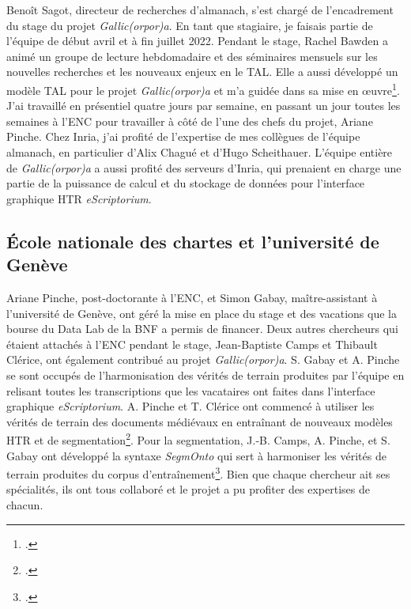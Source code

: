 \documentclass[class=article, crop=false]{standalone}
\begin{document}
Benoît Sagot, directeur de recherches d'\acrshort{almanach}, s'est chargé de l'encadrement du stage du projet \textit{Gallic(orpor)a}. En tant que stagiaire, je faisais partie de l'équipe de début avril et à fin juillet 2022. Pendant le stage, Rachel Bawden a animé un groupe de lecture hebdomadaire et des séminaires mensuels sur les nouvelles recherches et les nouveaux enjeux en le \acrlong{TAL}. Elle a aussi développé un modèle \acrshort{TAL} pour le projet \textit{Gallic(orpor)a} et m'a guidée dans sa mise en œuvre\footcite{bawdenAutomaticNormalisationEarly2022, gabayFreEMcorporaFreEMnormFreEM2022}. J'ai travaillé en présentiel quatre jours par semaine, en passant un jour toutes les semaines à l'\acrlong{ENC} pour travailler à côté de l'une des chefs du projet, Ariane Pinche. Chez \Gls{Inria}, j'ai profité de l'expertise de mes collègues de l'équipe \acrshort{almanach}, en particulier d'Alix Chagué et d'Hugo Scheithauer. L'équipe entière de \textit{Gallic(orpor)a} a aussi profité des serveurs d'\Gls{Inria}, qui prenaient en charge une partie de la puissance de calcul et du stockage de données pour l'interface graphique \acrshort{HTR} \textit{eScriptorium}.

\subsection{École nationale des chartes et l'université de Genève}

Ariane Pinche, post-doctorante à l'\acrlong{ENC}, et Simon Gabay, maître-assistant à l'université de Genève,  ont géré la mise en place du stage et des vacations que la bourse du Data Lab de la \acrshort{BNF} a permis de financer. Deux autres chercheurs qui étaient attachés à l'\acrlong{ENC} pendant le stage, Jean-Baptiste Camps et Thibault Clérice, ont également contribué au projet \textit{Gallic(orpor)a}. S. Gabay et A. Pinche se sont occupés de l'harmonisation des vérités de terrain produites par l'équipe en relisant toutes les transcriptions que les vacataires ont faites dans l'interface graphique \textit{eScriptorium}. A. Pinche et T. Clérice ont commencé à utiliser les vérités de terrain des documents médiévaux en entraînant de nouveaux modèles  \acrshort{HTR} et de segmentation\footcite{clericeYALTAiSegmontoManuscript2022}. Pour la segmentation, J.-B. Camps, A. Pinche, et S. Gabay ont développé la syntaxe \textit{SegmOnto} qui sert à harmoniser les vérités de terrain produites du corpus d'entraînement\footcite{gabaySegmOntoCommonVocabulary2021}. Bien que chaque chercheur ait ses spécialités, ils ont tous collaboré et le projet a pu profiter des expertises de chacun.
\end{document}

